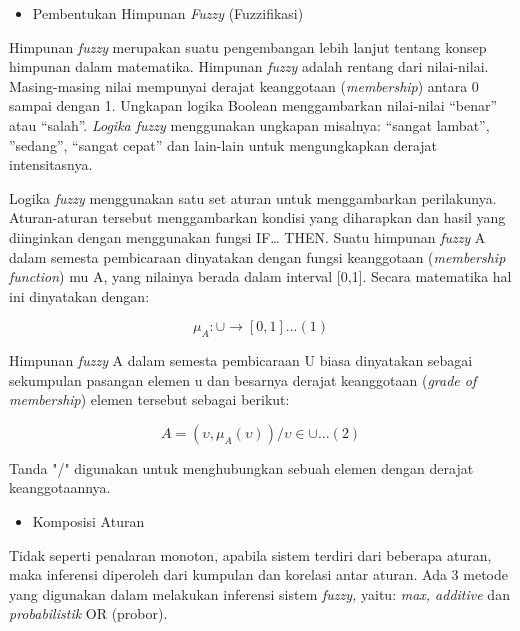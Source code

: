 \documentclass[a4paper]{article}
\begin{document}
\begin{multicols}{2}
\begin{itemize}
    \item Pembentukan Himpunan \textit{Fuzzy} (Fuzzifikasi)
\end{itemize}

\par Himpunan \textit{fuzzy} merupakan suatu pengembangan lebih lanjut tentang konsep himpunan dalam matematika. Himpunan \textit{fuzzy} adalah rentang dari nilai-nilai. Masing-masing nilai mempunyai derajat keanggotaan (\textit{membership}) antara 0 sampai dengan 1. Ungkapan logika Boolean menggambarkan nilai-nilai “benar” atau “salah”. \textit{Logika fuzzy} menggunakan ungkapan misalnya: “sangat lambat”, ”sedang”, “sangat cepat” dan lain-lain untuk mengungkapkan derajat intensitasnya.

\par Logika \textit{fuzzy} menggunakan satu set aturan untuk menggambarkan perilakunya. Aturan-aturan tersebut menggambarkan kondisi yang diharapkan dan hasil yang diinginkan dengan menggunakan fungsi IF… THEN. Suatu himpunan \textit{fuzzy} A dalam semesta pembicaraan dinyatakan dengan fungsi keanggotaan (\textit{membership function}) mu A, yang nilainya berada dalam interval [0,1]. Secara matematika hal ini dinyatakan dengan:

\begin{equation}
    \mu_{A} : \cup \rightarrow [0,1] ... (1)
\end{equation}

\par Himpunan \textit{fuzzy} A dalam semesta pembicaraan U biasa dinyatakan sebagai sekumpulan pasangan elemen u dan besarnya derajat keanggotaan (\textit{grade of membership}) elemen tersebut sebagai berikut:

\begin{equation}
    A = {(\upsilon, \mu_{A}(\upsilon))/\upsilon \in \cup}  ... (2)
\end{equation}

\par Tanda "/" digunakan untuk menghubungkan sebuah elemen dengan derajat keanggotaannya.

\begin{itemize}
    \item Komposisi Aturan
\end{itemize}

\par Tidak seperti penalaran monoton, apabila sistem terdiri dari beberapa aturan, maka inferensi diperoleh dari kumpulan dan korelasi antar aturan. Ada 3 metode yang digunakan dalam melakukan inferensi sistem \textit{fuzzy,} yaitu: \textit{max, additive} dan \textit{probabilistik} OR (probor).


\end{multicols}
\end{document}
